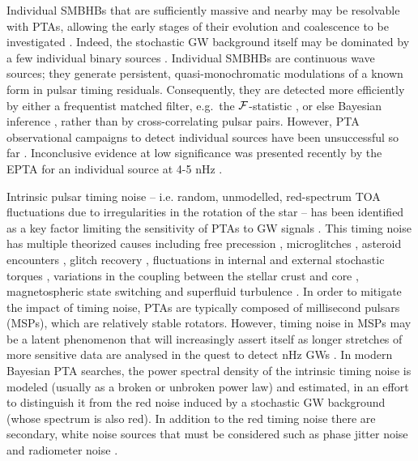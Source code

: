 \documentclass[fleqn,usenatbib,useAMS]{mnras}
\begin{document}
Individual SMBHBs that are sufficiently massive and nearby may be resolvable with PTAs, allowing the early stages of their evolution and coalescence to be investigated \citep{Sesana2010,Yardley2010,Zhu10,Babak2012,2013CQGra..30v4004E,Zhupulsarterms}. 
Indeed, the stochastic GW background itself may be dominated by a few individual binary sources \citep{Ravi2012singlesource}. Individual SMBHBs are continuous wave sources; they generate persistent, quasi-monochromatic modulations of a known form in pulsar timing residuals. Consequently, they are detected more efficiently by either a frequentist matched filter, e.g.\ the ${\cal F}$-statistic \citep{Lee2011MNRAS.414.3251L, Ellis2012ApJ,Zhu2014PPTA}, or else Bayesian inference \citep{Ellis2016,Arzoumanian2020A}, rather than by cross-correlating pulsar pairs. However, PTA observational campaigns to detect individual sources have been unsuccessful so far \citep{Jenet2004,Zhu2014PPTA,Babak2016,Arzoumanian2023}. Inconclusive evidence at low significance was presented recently by the EPTA for an individual source at 4-5 nHz \citep{2023arXiv230616226A}. \newline 


Intrinsic pulsar timing noise -- i.e.  random, unmodelled, red-spectrum TOA fluctuations due to irregularities in the rotation of the star -- has been identified as a key factor limiting the sensitivity of PTAs to GW signals \citep{Shannon2010,Lasky2015,Caballero2016,Goncharov2021}. This timing noise has multiple theorized causes including free precession \citep{free_precession_kerr,stairs_freeprecession}, microglitches \citep{Alessandro1995,Melatos2008,Espinoza2021}, asteroid encounters \citep{Shannon_2013,Brook_2014}, glitch recovery \citep{Johnston10,Hobbs2010glitch}, fluctuations in internal and external stochastic torques \citep{Cordes1981, 2006MNRAS.370L..76U,Myers2021MNRAS.502.3113M,Meyers2021,Antonelli2023}, variations in the coupling between the stellar crust and core \citep{Jones1990MNRAS.246..364J,Meyers2021,Melatos2023}, magnetospheric state switching \citep{magneto1,Lyne2010L,Stairs2019MNRAS.485.3230S} and superfluid turbulence \citep{Greenstein1970,Peralta2006,Melatos2014}. In order to mitigate the impact of timing noise, PTAs are typically composed of millisecond pulsars (MSPs), which are relatively stable rotators. However, timing noise in MSPs may be a latent phenomenon that will increasingly assert itself as longer stretches of more sensitive data are analysed in the quest to detect nHz GWs \citep{Shannon2010}. In modern Bayesian PTA searches, the power spectral density of the intrinsic timing noise is modeled (usually as a broken or unbroken power law) and estimated, in an effort to distinguish it from the red noise induced by a stochastic GW background (whose spectrum is also red). In addition to the red timing noise there are secondary, white noise sources that must be considered such as phase jitter noise and radiometer noise \citep{Cordes2010,Lam2019,Parthasarathy2021}. \newline 
\end{document}
